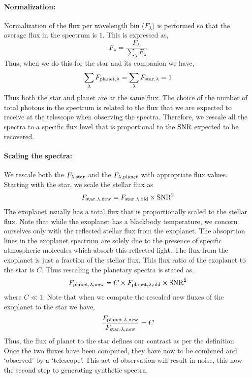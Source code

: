 \paragraph{Normalization:}
Normalization of the flux per wavelength bin ($F_\lambda$) is performed so that the average flux in the spectrum is $1$.
This is expressed as,
\begin{equation}
    F_\lambda = \dfrac{F_\lambda}{\sum\limits_{\lambda} F_{\lambda}}
\end{equation}
Thus, when we do this for the star and its companion we have,
\begin{equation}
    \sum\limits_{\lambda} F_{\rm{planet,\lambda}} = \sum\limits_{\lambda} F_{\rm{star},\lambda} = 1
\end{equation}
Thus both the star and planet are at the same flux. 
The choice of the number of total photons in the spectrum is related to the flux that we are expected to receive at the telescope when observing the spectra.
Therefore, we rescale all the spectra to a specific flux level that is proportional to the $\rm{SNR}$ expected to be recovered.
\paragraph{Scaling the spectra:}
We rescale both the $F_{\rm{\lambda,star}}$ and the $F_{\rm{\lambda,planet}}$ with appropriate flux values.
Starting with the star, we scale the stellar flux as
\begin{equation}
    F_{\rm{star,\lambda,new}} = F_{\rm{star,\lambda,old}}\times\rm{SNR}^2
    \label{eq:scaling of F}
\end{equation}
The exoplanet usually has a total flux that is proportionally scaled to the stellar flux.
Note that while the exoplanet has a blackbody temperature, we concern ourselves only with the reflected stellar flux from the exoplanet.
The absoprtion lines in the exoplanet spectrum are solely due to the presence of specific atmospheric molecules which absorb this reflected light.
The flux from the exoplanet is just a fraction of the stellar flux.
This flux ratio of the exoplanet to the star is $C$.
Thus rescaling the planetary spectra is stated as,
\begin{equation}
    F_{\rm{planet},\lambda,new} = C\times F_{\rm{planet},\lambda,old}\times \rm{SNR}^2
    \label{eq:exoplanet flux}
\end{equation}
where $C\ll1$.
Note that when we compute the rescaled new fluxes of the exoplanet to the star we have,
\begin{equation}
    \dfrac{F_{\rm{planet,\lambda,new}}}{F_{\rm{star,\lambda,new}}} = C
    \label{eq: defn of contrast}
\end{equation}
Thus, the flux of planet to the star defines our contrast as per the definition.
Once the two fluxes have been computed, they have now to be combined and `observed' by a `telescope'.
This act of observation will result in noise, this now the second step to generating synthetic spectra.
